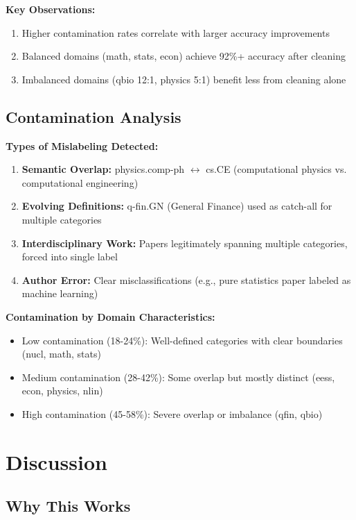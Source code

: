 \documentclass{article}
\begin{document}
\textbf{Key Observations:}
\begin{enumerate}
    \item Higher contamination rates correlate with larger accuracy improvements
    \item Balanced domains (math, stats, econ) achieve 92\%+ accuracy after cleaning
    \item Imbalanced domains (qbio 12:1, physics 5:1) benefit less from cleaning alone
\end{enumerate}

\subsection{Contamination Analysis}

\textbf{Types of Mislabeling Detected:}
\begin{enumerate}
    \item \textbf{Semantic Overlap:} physics.comp-ph $\leftrightarrow$ cs.CE (computational physics vs. computational engineering)
    \item \textbf{Evolving Definitions:} q-fin.GN (General Finance) used as catch-all for multiple categories
    \item \textbf{Interdisciplinary Work:} Papers legitimately spanning multiple categories, forced into single label
    \item \textbf{Author Error:} Clear misclassifications (e.g., pure statistics paper labeled as machine learning)
\end{enumerate}

\textbf{Contamination by Domain Characteristics:}
\begin{itemize}
    \item Low contamination (18-24\%): Well-defined categories with clear boundaries (nucl, math, stats)
    \item Medium contamination (28-42\%): Some overlap but mostly distinct (eess, econ, physics, nlin)
    \item High contamination (45-58\%): Severe overlap or imbalance (qfin, qbio)
\end{itemize}

\section{Discussion}

\subsection{Why This Works}
\end{document}
